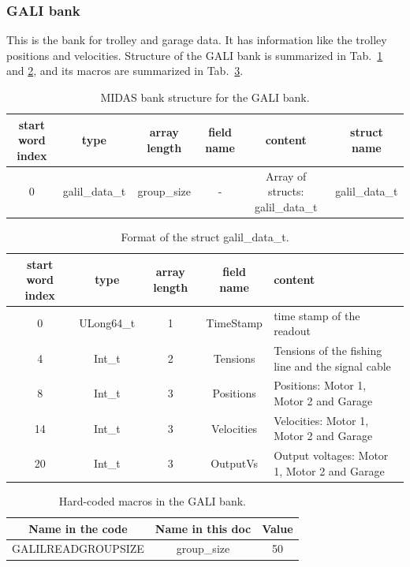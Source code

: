 \subsubsection*{GALI bank}

This is the bank for trolley and garage data. It has information like the trolley positions and velocities. Structure of the GALI bank is summarized in Tab.~\ref{tab:galitable1} and \ref{tab:galitable2}, and its macros are summarized in Tab.~\ref{tab:galimacro}.


\begin{table}[htbp]
\centering
\caption{MIDAS bank structure for the GALI bank.}
\begin{tabular}{|c|c|c|c|c|c|}
\hline
start word index & type           & array length & field name & content  & struct name \\
\hline
0                & galil\_data\_t & group\_size  & -          & Array of structs: galil\_data\_t & galil\_data\_t              \\
\hline
\end{tabular}
\label{tab:galitable1}
\end{table}

\begin{table}[htbp]
\centering
\caption{Format of the struct galil\_data\_t.}
\begin{tabular}{|c|c|c|c|p{5cm}|}
\hline
start word index & type & array length & field name	 & content \\
\hline
0  & ULong64\_t & 1 & TimeStamp  & time stamp of the readout                         \\
\hline
4  & Int\_t     & 2 & Tensions   & Tensions of the fishing line and the signal cable \\
\hline
8  & Int\_t     & 3 & Positions  & Positions: Motor 1, Motor 2 and Garage            \\
\hline
14 & Int\_t     & 3 & Velocities & Velocities: Motor 1, Motor 2 and Garage           \\
\hline
20 & Int\_t     & 3 & OutputVs   & Output voltages: Motor 1, Motor 2 and Garage  \\
\hline
\end{tabular}
\label{tab:galitable2}
\end{table}

\begin{table}[htbp]
\centering
\caption{Hard-coded macros in the GALI bank.}
\begin{tabular}{|c|c|c|}
\hline
Name in the code	& Name in this doc & Value \\
\hline
GALILREADGROUPSIZE & group\_size & 50 \\
\hline
\end{tabular} 
\label{tab:galimacro}
\end{table}

